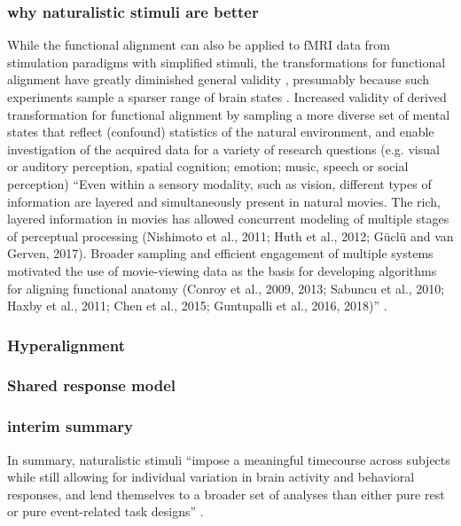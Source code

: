 \subsubsection{why naturalistic stimuli are better}
%
While the functional alignment can also be applied to fMRI data from stimulation
paradigms with simplified stimuli, the transformations for functional alignment
have greatly diminished general validity \citep{haxby2011common}, presumably
because such experiments sample a sparser range of brain states
\citep{guntupalli2016model}.
%
Increased validity of derived transformation for functional alignment by
sampling a more diverse set of mental states that reflect (confound) statistics
of the natural environment, and enable investigation of the acquired data for a
variety of research questions (e.g. visual or auditory perception, spatial
cognition; emotion; music, speech or social perception)
%
``Even within a sensory modality, such as vision, different types of information
are layered and simultaneously present in natural movies. The rich, layered
information in movies has allowed concurrent modeling of multiple stages of
perceptual processing (Nishimoto et al., 2011; Huth et al., 2012; Güclü and van
Gerven, 2017). Broader sampling and efficient engagement of multiple systems
motivated the use of movie-viewing data as the basis for developing algorithms
for aligning functional anatomy (Conroy et al., 2009, 2013; Sabuncu et al.,
2010; Haxby et al., 2011; Chen et al., 2015; Guntupalli et al., 2016, 2018)''
\citep{haxby2020naturalistic}.


\subsubsection{Hyperalignment}



\subsubsection{Shared response model}



\subsubsection{interim summary}
In summary, naturalistic stimuli ``impose a meaningful timecourse across
subjects while still allowing for individual variation in brain activity and
behavioral responses, and lend themselves to a broader set of analyses than
either pure rest or pure event-related task designs'' \citep{finn2017can}.


